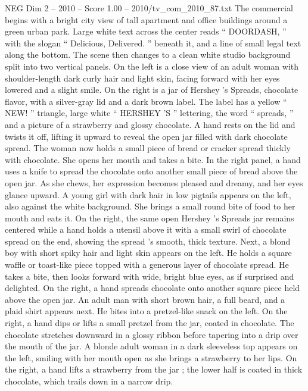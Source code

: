 \begin{textsample}{NEG Dim 2 – 2010 – Score 1.00 – 2010/tv\_com\_2010\_87.txt}  \label{ex:f2_neg_049}
The commercial begins with a bright city view of tall apartment and office buildings around a green urban park.
Large white text across the center reads “ DOORDASH, ” with the slogan “ Delicious, Delivered. ” beneath it, and a line of small legal text along the bottom.
The scene then changes to a clean white studio background split into two vertical panels.
On the left is a close view of an adult woman with shoulder-length dark curly hair and light skin, facing forward with her eyes lowered and a slight smile.
On the right is a jar of Hershey ’s Spreads, chocolate flavor, with a silver-gray lid and a dark brown label.
The label has a yellow “ NEW! ” triangle, large white “ HERSHEY ’S ” lettering, the word “ spreads, ” and a picture of a strawberry and glossy chocolate.
A hand rests on the lid and twists it off, lifting it upward to reveal the open jar filled with dark chocolate spread.
The woman now holds a small piece of bread or cracker spread thickly with chocolate.
She opens her mouth and takes a bite.
In the right panel, a hand uses a knife to spread the chocolate onto another small piece of bread above the open jar.
As she chews, her expression becomes pleased and dreamy, and her eyes glance upward.
A young girl with dark hair in low pigtails appears on the left, also against the white background.
She brings a small round bite of food to her mouth and eats it.
On the right, the same open Hershey ’s Spreads jar remains centered while a hand holds a utensil above it with a small swirl of chocolate spread on the end, showing the spread ’s smooth, thick texture.
Next, a blond boy with short spiky hair and light skin appears on the left.
He holds a square waffle or toast-like piece topped with a generous layer of chocolate spread.
He takes a bite, then looks forward with wide, bright blue eyes, as if surprised and delighted.
On the right, a hand spreads chocolate onto another square piece held above the open jar.
An adult man with short brown hair, a full beard, and a plaid shirt appears next.
He bites into a pretzel-like snack on the left.
On the right, a hand dips or lifts a small pretzel from the jar, coated in chocolate.
The chocolate stretches downward in a glossy ribbon before tapering into a drip over the mouth of the jar.
A blonde adult woman in a dark sleeveless top appears on the left, smiling with her mouth open as she brings a strawberry to her lips.
On the right, a hand lifts a strawberry from the jar ; the lower half is coated in thick chocolate, which trails down in a narrow drip.

\end{textsample}
